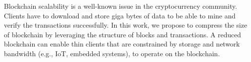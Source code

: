 Blockchain scalability is a well-known issue in the cryptocurrency community.
Clients have to download and store giga bytes of data to be able to mine and verify the transactions successfully.
In this work, we propose to compress the size of \eth{} blockchain by leveraging the structure of blocks and transactions.
A reduced blockchain can enable thin clients  that are constrained by storage and network bandwidth (e.g., IoT, embedded systems),
 to operate on the \eth{} blockchain.

